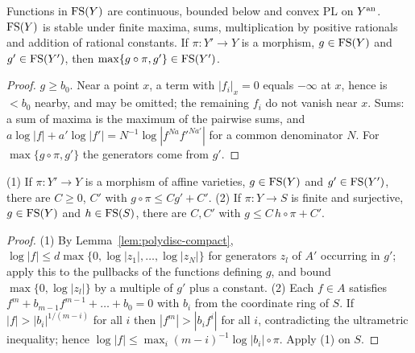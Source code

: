 \begin{lemma}\label{lem:fs-basic}
\leanok
{}
Functions in $\mathrm{FS}(Y)$ are continuous, bounded below and convex PL on $Y^{\mathrm{an}}$. $\mathrm{FS}(Y)$ is
stable under finite maxima, sums, multiplication by positive rationals and addition of rational
constants. If $\pi\colon Y'\to Y$ is a morphism, $g\in\mathrm{FS}(Y)$ and $g'\in\mathrm{FS}(Y')$, then
$\max\{g\circ\pi,g'\}\in\mathrm{FS}(Y')$.
\end{lemma}

\begin{proof}
$g\ge b_0$. Near a point $x$, a term with $|f_i|_x=0$ equals $-\infty$ at $x$, hence is $<b_0$
nearby, and may be omitted; the remaining $f_i$ do not vanish near $x$. Sums: a sum of maxima
is the maximum of the pairwise sums, and $a\log|f|+a'\log|f'|=N^{-1}\log|f^{Na}f'^{Na'}|$ for a
common denominator $N$. For $\max\{g\circ\pi,g'\}$ the generators come from $g'$.
\end{proof}

\begin{lemma}\label{lem:growth}
\leanok
{}
(1) If $\pi\colon Y'\to Y$ is a morphism of affine varieties, $g\in\mathrm{FS}(Y)$ and $g'\in\mathrm{FS}(Y')$,
there are $C\ge0$, $C'$ with $g\circ\pi\le Cg'+C'$. (2) If $\pi\colon Y\to S$ is finite and
surjective, $g\in\mathrm{FS}(Y)$ and $h\in\mathrm{FS}(S)$, there are $C,C'$ with $g\le C\,h\circ\pi+C'$.
\end{lemma}

\begin{proof}
(1) By Lemma~\ref{lem:polydisc-compact}, $\log|f|\le d\max\{0,\log|z_1|,\dots,\log|z_N|\}$ for
generators $z_l$ of $A'$ occurring in $g'$; apply this to the pullbacks of the functions defining
$g$, and bound $\max\{0,\log|z_l|\}$ by a multiple of $g'$ plus a constant. (2) Each $f\in A$
satisfies $f^m+b_{m-1}f^{m-1}+\dots+b_0=0$ with $b_i$ from the coordinate ring of $S$. If
$|f|>|b_i|^{1/(m-i)}$ for all $i$ then $|f^m|>|b_if^i|$ for all $i$, contradicting the
ultrametric inequality; hence $\log|f|\le\max_i(m-i)^{-1}\log|b_i|\circ\pi$. Apply (1) on $S$.
\end{proof}

